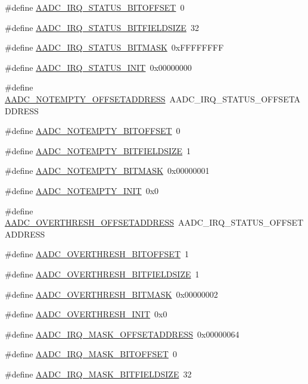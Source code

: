 \begin{DoxyCompactItemize}
\item 
\#define \hyperlink{a00543_a9f7eb15d367ca6cd341dda58fef4266d}{AADC\_\-IRQ\_\-STATUS\_\-BITOFFSET}~0
\item 
\#define \hyperlink{a00543_ab612ebc898e8cfea7155c02e00faaf57}{AADC\_\-IRQ\_\-STATUS\_\-BITFIELDSIZE}~32
\item 
\#define \hyperlink{a00543_a721b8c90938becaca77c9814dbdca3aa}{AADC\_\-IRQ\_\-STATUS\_\-BITMASK}~0xFFFFFFFF
\item 
\#define \hyperlink{a00543_a09e3e2376c6c0444fc6fe50c242a1cfb}{AADC\_\-IRQ\_\-STATUS\_\-INIT}~0x00000000
\item 
\#define \hyperlink{a00543_a3726fc88b3309ab10dc54e1798bc520c}{AADC\_\-NOTEMPTY\_\-OFFSETADDRESS}~AADC\_\-IRQ\_\-STATUS\_\-OFFSETADDRESS
\item 
\#define \hyperlink{a00543_a25925d56223364e31c373c4880484d0c}{AADC\_\-NOTEMPTY\_\-BITOFFSET}~0
\item 
\#define \hyperlink{a00543_af50c7968977413e9a59adf518fc2d6f6}{AADC\_\-NOTEMPTY\_\-BITFIELDSIZE}~1
\item 
\#define \hyperlink{a00543_a6fa481be2762449640412ef6985cdaf9}{AADC\_\-NOTEMPTY\_\-BITMASK}~0x00000001
\item 
\#define \hyperlink{a00543_a275edcb1a37ca9315220c4266af71a06}{AADC\_\-NOTEMPTY\_\-INIT}~0x0
\item 
\#define \hyperlink{a00543_aebadcb69c86ca2da5f758972eccfd8f4}{AADC\_\-OVERTHRESH\_\-OFFSETADDRESS}~AADC\_\-IRQ\_\-STATUS\_\-OFFSETADDRESS
\item 
\#define \hyperlink{a00543_ac7764bbfbc96bf43213b9c87b6aacc21}{AADC\_\-OVERTHRESH\_\-BITOFFSET}~1
\item 
\#define \hyperlink{a00543_a972fdfad37a07d233e4ec237668add74}{AADC\_\-OVERTHRESH\_\-BITFIELDSIZE}~1
\item 
\#define \hyperlink{a00543_a1d540d576f19aefba14b4f325fc1beaa}{AADC\_\-OVERTHRESH\_\-BITMASK}~0x00000002
\item 
\#define \hyperlink{a00543_ada847088f72f77d1c20b0a01d5bb83f1}{AADC\_\-OVERTHRESH\_\-INIT}~0x0
\item 
\#define \hyperlink{a00543_a2beae179cd2a8c73f653e96a29169c21}{AADC\_\-IRQ\_\-MASK\_\-OFFSETADDRESS}~0x00000064
\item 
\#define \hyperlink{a00543_a79d56a426023634751c4a5f5b6805d8d}{AADC\_\-IRQ\_\-MASK\_\-BITOFFSET}~0
\item 
\#define \hyperlink{a00543_a3f0fb3db183d7774f13568daf1fa8c73}{AADC\_\-IRQ\_\-MASK\_\-BITFIELDSIZE}~32
\item 

\end{DoxyCompactItemize}

